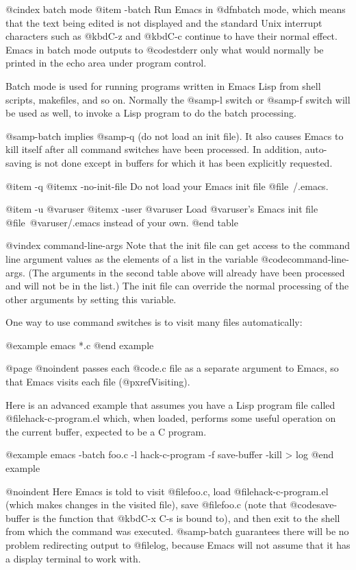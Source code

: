 {{@cindex batch mode
@item -batch
Run Emacs in @dfn{batch mode}, which means that the text being edited is
not displayed and the standard Unix interrupt characters such as
@kbd{C-z} and @kbd{C-c} continue to have their normal effect.  Emacs in
batch mode outputs to @code{stderr} only what would normally be printed
in the echo area under program control.

Batch mode is used for running programs written in Emacs Lisp from shell
scripts, makefiles, and so on.  Normally the @samp{-l} switch or
@samp{-f} switch will be used as well, to invoke a Lisp program to do
the batch processing.

@samp{-batch} implies @samp{-q} (do not load an init file).  It also
causes Emacs to kill itself after all command switches have been
processed.  In addition, auto-saving is not done except in buffers for
which it has been explicitly requested.

@item -q
@itemx -no-init-file
Do not load your Emacs init file @file{~/.emacs}.

@item -u @var{user}
@itemx -user @var{user}
Load @var{user}'s Emacs init file @file{~@var{user}/.emacs} instead of
your own.
@end table

@vindex command-line-args
  Note that the init file can get access to the command line argument
values as the elements of a list in the variable
@code{command-line-args}.  (The arguments in the second table above will
already have been processed and will not be in the list.)  The init file
can override the normal processing of the other arguments by setting
this variable.

  One way to use command switches is to visit many files automatically:

@example
emacs *.c
@end example

@page
@noindent
passes each @code{.c} file as a separate argument to Emacs, so that
Emacs visits each file (@pxref{Visiting}).

  Here is an advanced example that assumes you have a Lisp program file
called @file{hack-c-program.el} which, when loaded, performs some useful
operation on the current buffer, expected to be a C program.

@example
emacs -batch foo.c -l hack-c-program -f save-buffer -kill > log
@end example

@noindent
Here Emacs is told to visit @file{foo.c}, load @file{hack-c-program.el}
(which makes changes in the visited file), save @file{foo.c} (note that
@code{save-buffer} is the function that @kbd{C-x C-s} is bound to), and
then exit to the shell from which the command was executed.  @samp{-batch}
guarantees there will be no problem redirecting output to @file{log},
because Emacs will not assume that it has a display terminal to work
with.

}}
